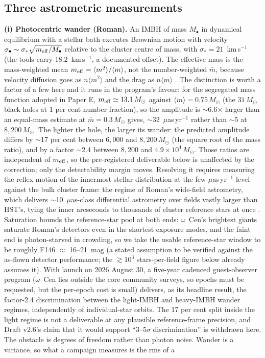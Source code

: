\documentclass[11pt]{article}
\newcommand{\msun}{\ensuremath{M_\odot}}
\newcommand{\ocen}{\ensuremath{\omega}~Cen}
\begin{document}
\subsection{Three astrometric measurements}
\label{sec:wander}

\textbf{(i) Photocentric wander (Roman).} An IMBH of mass $M_{\bullet}$ in dynamical equilibrium with a stellar bath executes Brownian motion with velocity $\sigma_{\bullet} \sim \sigma_{*}\sqrt{m_{\rm eff}/M_{\bullet}}$ relative to the cluster centre of mass, with $\sigma_{*} = 21$~km\,s$^{-1}$ \citep{Haberle2025oMEGACatVI} (the tools carry $18.2$~km\,s$^{-1}$, a documented offset). The effective mass is the mass-weighted mean $m_{\rm eff} = \langle m^{2}\rangle/\langle m\rangle$, not the number-weighted $\bar m$, because velocity diffusion goes as $n\langle m^{2}\rangle$ and the drag as $n\langle m\rangle$ \citep{ChatterjeeHernquistLoeb2002,MerrittBerczikLaun2007}. The distinction is worth a factor of a few here and it runs in the program's favour: for the segregated mass function adopted in Paper E, $m_{\rm eff} \simeq 13.1\,\msun$ against $\langle m\rangle = 0.75\,\msun$ (the $31\,\msun$ black holes at 1 per cent number fraction), so the amplitude is $\sim$6.6$\times$ larger than an equal-mass estimate at $\bar m = 0.3\,\msun$ gives, $\sim$32~$\mu$as\,yr$^{-1}$ rather than $\sim$5 at $8{,}200\,\msun$. The lighter the hole, the larger its wander: the predicted amplitude differs by $\sim$17 per cent between $6{,}000$ and $8{,}200\,\msun$ (the square root of the mass ratio), and by a factor $\sim$2.4 between $8{,}200$ and $4.9\times10^{4}\,\msun$. Those ratios are independent of $m_{\rm eff}$, so the pre-registered deliverable below is unaffected by the correction; only the detectability margin moves. Resolving it requires measuring the reflex motion of the innermost stellar distribution at the few-$\mu$as\,yr$^{-1}$ level against the bulk cluster frame: the regime of Roman's wide-field astrometry, which delivers $\sim$10~$\mu$as-class differential astrometry over fields vastly larger than HST's, tying the inner arcseconds to thousands of cluster reference stars at once \citep{Sanderson2019}. Saturation bounds the reference-star pool at both ends: \ocen's brightest giants saturate Roman's detectors even in the shortest exposure modes, and the faint end is photon-starved in crowding, so we take the usable reference-star window to be roughly F146 $\approx$ 16--21~mag (a stated assumption to be verified against the as-flown detector performance; the $\gtrsim 10^{3}$ stars-per-field figure below already assumes it). With launch on 2026 August 30, a five-year cadenced guest-observer program ($\omega$~Cen lies outside the core community surveys, so epochs must be requested, but the per-epoch cost is small) delivers, as its headline result, the factor-2.4 discrimination between the light-IMBH and heavy-IMBH wander regimes, independently of individual-star orbits. The 17 per cent split inside the light regime is not a deliverable at any plausible reference-frame precision, and Draft v2.6's claim that it would support ``3--5$\sigma$ discrimination'' is withdrawn here. The obstacle is degrees of freedom rather than photon noise. Wander is a variance, so what a campaign measures is the rms of a 
\end{document}

